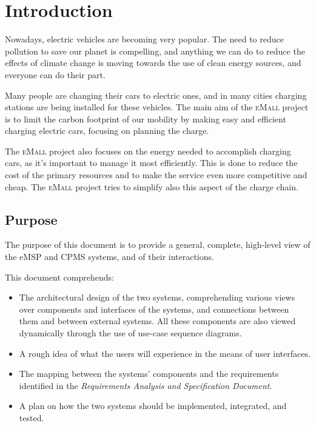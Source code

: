 \chapter{Introduction} \label{introduction}

Nowadays, electric vehicles are becoming very popular. The need to reduce pollution to save our planet is compelling, and anything we can do to reduce the effects of climate change is moving towards the use of clean energy sources, and everyone can do their part.\medskip

Many people are changing their cars to electric ones, and in many cities charging stations are being installed for these vehicles. The main aim of the \textsc{eMall} project is to limit the carbon footprint of our mobility by making easy and efficient charging electric cars, focusing on planning the charge.\medskip

The \textsc{eMall} project also focuses on the energy needed to accomplish charging cars, as it's important to manage it most efficiently. This is done to reduce the cost of the primary resources and to make the service even more competitive and cheap. The \textsc{eMall} project tries to simplify also this aspect of the charge chain.

\section{Purpose}

The purpose of this document is to provide a general, complete, high-level view of the eMSP and CPMS systems, and of their interactions.\medskip

This document comprehends:
\begin{itemize}
    \item The architectural design of the two systems, comprehending various views over components and interfaces of the systems, and connections between them and between external systems. All these components are also viewed dynamically through the use of use-case sequence diagrams.
    \item A rough idea of what the users will experience in the means of user interfaces.
    \item The mapping between the systems' components and the requirements identified in the \textit{Requirements Analysis and Specification Document}.
    \item A plan on how the two systems should be implemented, integrated, and tested.
\end{itemize}

